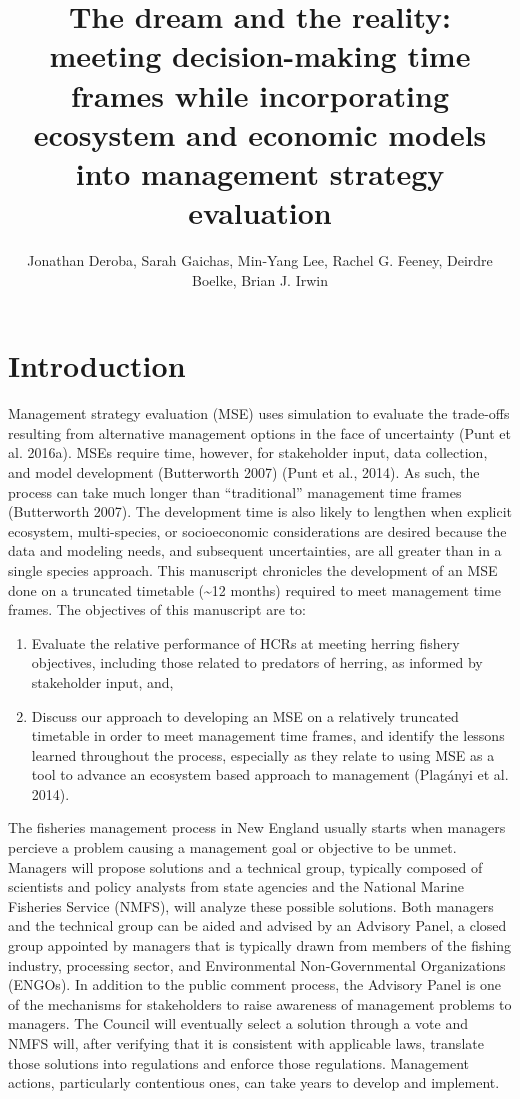 \documentclass[]{article}
\title{The dream and the reality: meeting decision-making time frames while
incorporating ecosystem and economic models into management strategy
evaluation}
\author{Jonathan Deroba, Sarah Gaichas, Min-Yang Lee, Rachel G. Feeney, Deirdre
Boelke, Brian J. Irwin}
\date{}
\begin{document}
\maketitle

\doublespacing

\section{Introduction}\label{introduction}

Management strategy evaluation (MSE) uses simulation to evaluate the
trade-offs resulting from alternative management options in the face of
uncertainty (Punt et al. 2016a). MSEs require time, however, for
stakeholder input, data collection, and model development (Butterworth
2007) (Punt et al., 2014). As such, the process can take much longer
than ``traditional'' management time frames (Butterworth 2007). The
development time is also likely to lengthen when explicit ecosystem,
multi-species, or socioeconomic considerations are desired because the
data and modeling needs, and subsequent uncertainties, are all greater
than in a single species approach. This manuscript chronicles the
development of an MSE done on a truncated timetable (\textasciitilde{}12
months) required to meet management time frames. The objectives of this
manuscript are to:

\begin{enumerate}
\def\labelenumi{\arabic{enumi}.}
\item
  Evaluate the relative performance of HCRs at meeting herring fishery
  objectives, including those related to predators of herring, as
  informed by stakeholder input, and,
\item
  Discuss our approach to developing an MSE on a relatively truncated
  timetable in order to meet management time frames, and identify the
  lessons learned throughout the process, especially as they relate to
  using MSE as a tool to advance an ecosystem based approach to
  management (Plagányi et al. 2014).
\end{enumerate}

The fisheries management process in New England usually starts when
managers percieve a problem causing a management goal or objective to be
unmet. Managers will propose solutions and a technical group, typically
composed of scientists and policy analysts from state agencies and the
National Marine Fisheries Service (NMFS), will analyze these possible
solutions. Both managers and the technical group can be aided and
advised by an Advisory Panel, a closed group appointed by managers that
is typically drawn from members of the fishing industry, processing
sector, and Environmental Non-Governmental Organizations (ENGOs). In
addition to the public comment process, the Advisory Panel is one of the
mechanisms for stakeholders to raise awareness of management problems to
managers. The Council will eventually select a solution through a vote
and NMFS will, after verifying that it is consistent with applicable
laws, translate those solutions into regulations and enforce those
regulations. Management actions, particularly contentious ones, can take
years to develop and implement.
\end{document}

